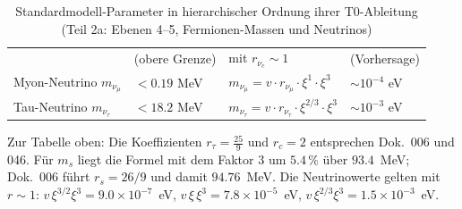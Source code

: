 \begin{table}[htbp]
{\begin{tabular}{p{4cm}p{2.5cm}p{3.5cm}p{2.7cm}}
			& (obere Grenze) & mit $r_{\nu_e} \sim 1$ & (Vorhersage) \\[0.3em]
			Myon-Neutrino $m_{\nu_\mu}$ & $< 0.19$ MeV & $m_{\nu_\mu} = v \cdot r_{\nu_\mu} \cdot \xi^{1} \cdot \xi^3$ & $\sim 10^{-4}$ eV \\
			Tau-Neutrino $m_{\nu_\tau}$ & $< 18.2$ MeV & $m_{\nu_\tau} = v \cdot r_{\nu_\tau} \cdot \xi^{2/3} \cdot \xi^3$ & $\sim 10^{-3}$ eV \\
			\bottomrule
		\end{tabular}%
}
	\caption{Standardmodell-Parameter in hierarchischer Ordnung ihrer T0-Ableitung (Teil 2a: Ebenen 4--5, Fermionen-Massen und Neutrinos)}
	\label{tab:sm-params-2a}
\end{table}
Zur Tabelle oben: Die Koeffizienten $r_\tau = \frac{25}{9}$ und $r_c = 2$ entsprechen Dok.~006 und 046. Für $m_s$ liegt die Formel mit dem Faktor $3$ um $5.4\,\%$ über $93.4$~MeV; Dok.~006 führt $r_s = 26/9$ und damit $94.76$~MeV. Die Neutrinowerte gelten mit $r \sim 1$: $v\,\xi^{3/2}\xi^3 = 9.0\times10^{-7}$~eV, $v\,\xi\,\xi^3 = 7.8\times10^{-5}$~eV, $v\,\xi^{2/3}\xi^3 = 1.5\times10^{-3}$~eV.

